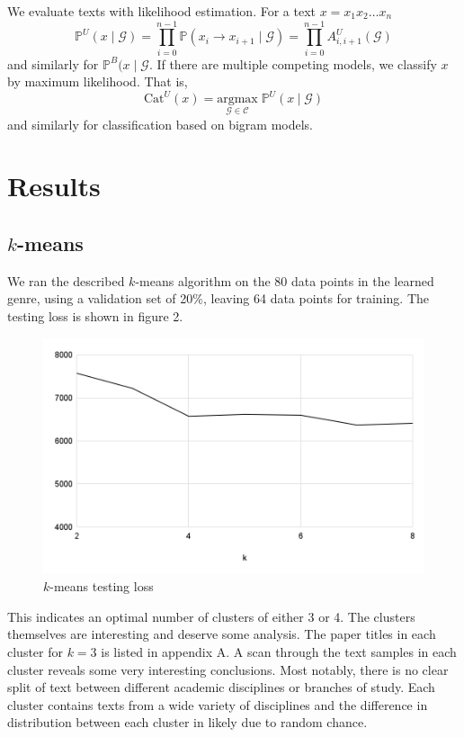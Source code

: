 \documentclass{article}
\begin{document}
We evaluate texts with likelihood estimation. For a text $x = x_1 x_2 \dots x_n$
\begin{equation}
\mathbb{P}^U(x \;|\; \mathcal{G}) = \prod_{i = 0}^{n - 1} \mathbb{P}(x_i \to x_{i+1} \; |\; \mathcal{G}) = \prod_{i = 0}^{n - 1} A^U_{i,i+1}(\mathcal{G})
\end{equation}
and similarly for $\mathbb{P}^B(x \;|\; \mathcal{G}$. If there are multiple competing models, we classify $x$ by maximum likelihood. That is,
\begin{equation}
\mathrm{Cat}^U(x) = \underset{\mathcal{G} \in \mathcal{C}}{\mathrm{argmax}} \; \mathbb{P}^U(x \:|\; \mathcal{G})
\end{equation}
and similarly for classification based on bigram models.

\section{Results}
\subsection{$k$-means}
We ran the described $k$-means algorithm on the 80 data points in the learned genre, using a validation set of 20\%, leaving 64 data points for training. The testing loss is shown in figure 2.

\begin{figure}
\centering
\includegraphics[width=0.7\linewidth]{img/chart.png}
\caption{$k$-means testing loss}
\end{figure}

This indicates an optimal number of clusters of either 3 or 4. The clusters themselves are interesting and deserve some analysis. The paper titles in each cluster for $k = 3$ is listed in appendix A. A scan through the text samples in each cluster reveals some very interesting conclusions. Most notably, there is no clear split of text between different academic disciplines or branches of study. Each cluster contains texts from a wide variety of disciplines and the difference in distribution between each cluster in likely due to random chance.
\end{document}
